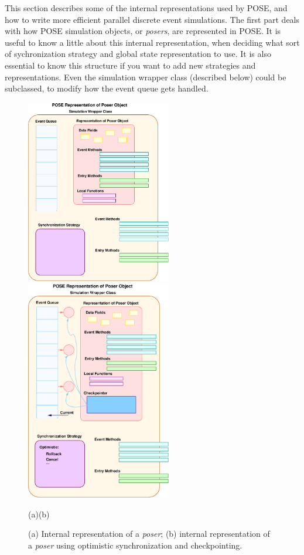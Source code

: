 \documentclass[10pt]{article}
\begin{document}
This section describes some of the internal representations used by
POSE, and how to write more efficient parallel discrete event
simulations.  The first part deals with how POSE simulation objects, or
{\it posers}, are represented in POSE.  It is useful to know a little
about this internal representation, when deciding what sort of
sychronization strategy and global state representation to use.  It is
also essential to know this structure if you want to add new
strategies and representations.  Even the simulation wrapper class
(described below) could be subclassed, to modify how the event queue
gets handled. 

\begin{figure}[h]
\begin{center}
\includegraphics[width=2.5in]{pose_struct}
\hskip0.5in
\includegraphics[width=2.5in]{opt_struct}
\end{center}
\hskip1.7in(a)\hskip2.2in(b)\\
\caption{(a) Internal representation of a {\it poser}; (b) internal representation of a {\it poser} using optimistic
synchronization and checkpointing.}
\label{fig:pose_struct}
\end{figure}
\end{document}
